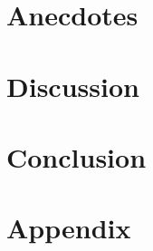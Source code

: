 \documentclass[10pt]{article}
\begin{document}
\section{Anecdotes}


\section{Discussion}


\section{Conclusion}





\newpage
\appendix
\section*{Appendix}
\lstset{numbers=left}




\end{document}
